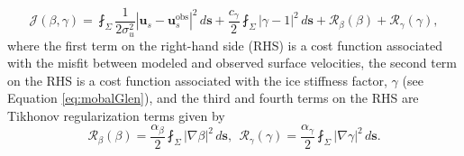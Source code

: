 \begin{equation}
\label{eq:optimFunctional}
{\ensuremath{\mathcal J}}(\beta, \gamma) = \fint_{\Sigma}
\frac{1}{2\sigma_u^2}|{\boldsymbol{u}}_{s} - {\boldsymbol{u}}_{s}^{{{\ensuremath{\text{obs}}}}}|^2\,{d\boldsymbol{s}} + \frac{c_{\gamma}}{2} \fint_{\Sigma}
|\gamma - 1|^2\,{d\boldsymbol{s}} + \mathcal R_{\beta}(\beta) + \mathcal R_{\gamma}(\gamma),
\end{equation}
where the first term on the right-hand side (RHS) is a cost function associated with the misfit between modeled and observed surface velocities, 
the second term on the RHS is a cost function associated with the ice stiffness factor, $\gamma$ (see Equation \ref{eq:mobalGlen}), and the third and fourth terms on the RHS are Tikhonov regularization terms given by
\begin{equation}
\label{eq:reguarlization}
\mathcal R_{\beta}(\beta) = \frac{\alpha_\beta}2\fint_{\Sigma}|\nabla\beta|^2 \,{d\boldsymbol{s}},
~~\mathcal R_{\gamma}(\gamma) = \frac{\alpha_\gamma}2\fint_{\Sigma}|\nabla\gamma|^2 \,{d\boldsymbol{s}}.
\end{equation}
